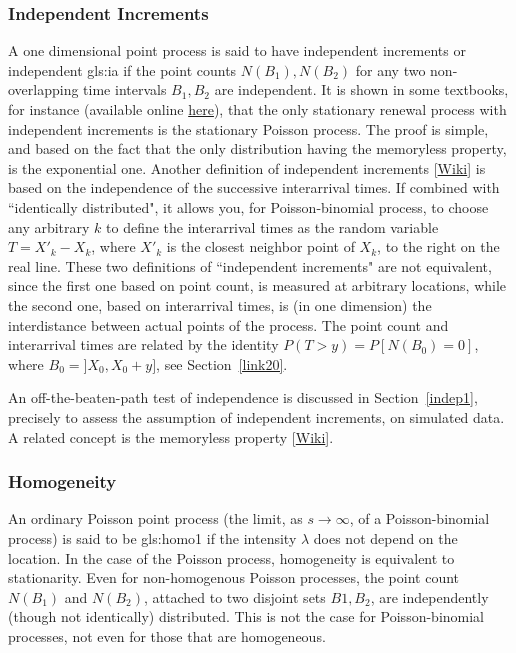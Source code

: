 \documentclass[10pt]{article}
\begin{document}
\subsubsection{Independent Increments}\label{indinc}

A one dimensional point process is said to have \textcolor{index}{independent increments} 
or independent \gls{gls:ia} 
if the point counts $N(B_1), N(B_2)$ for any two non-overlapping time intervals
 $B_1,B_2$ are independent.  It is shown in some textbooks, for instance \cite{karl} (available online \href{http://www.columbia.edu/~ks20/stochastic-I/stochastic-I-PP.pdf}{here}), that the only stationary 
\textcolor{index}{renewal process} with independent increments is the stationary Poisson process. The proof is simple, and based on the fact that the only distribution having the memoryless property, is the exponential one. Another definition of independent increments [\href{https://en.wikipedia.org/wiki/Independent_increments}{Wiki}] is based on the independence of the successive interarrival times. If combined with ``identically distributed", it allows you, for Poisson-binomial process, to choose any arbitrary $k$ to define the interarrival times as the random variable $T=X'_k-X_k$, where $X'_k$ is the closest neighbor point of $X_k$, to the right on the real line. These two definitions of ``independent increments" are not equivalent, since the first one based on point count, is measured at arbitrary locations, while the second one, based on interarrival times, is (in one dimension) the interdistance between actual points of the process. The point count and interarrival times are related by the identity $P(T>y)=P[N(B_0)=0]$, where $B_0=]X_0,X_0+y]$, see Section~\ref{link20}.

An off-the-beaten-path test of independence is discussed in Section~\ref{indep1}, precisely to assess the assumption of independent increments, on simulated data. A related concept is the \textcolor{index}{memoryless property} [\href{https://en.wikipedia.org/wiki/Memorylessness}{Wiki}]. 


\subsubsection{Homogeneity}\label{homgprop}

An ordinary Poisson point process (the limit, as $s\rightarrow\infty$, of a Poisson-binomial process) is said to be 
\gls{gls:homo1} %
if the intensity $\lambda$ does not depend on the location. In the case of the Poisson process, homogeneity is equivalent to stationarity. Even for non-homogenous Poisson processes,
the point count $N(B_1)$ and $N(B_2)$, attached to two disjoint sets $B1,B_2$, are independently (though not identically) distributed. This is not the case for Poisson-binomial processes, not even for those that are homogeneous.  
\end{document}

